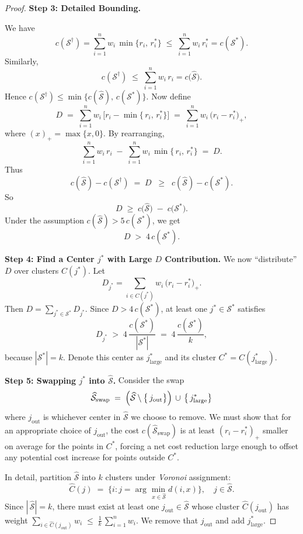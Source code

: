 \begin{proof}
\medskip
\noindent
\textbf{Step 3: Detailed Bounding.}

We have
\[
  c(\mathcal{S}^\dagger)
  =
  \sum_{i=1}^n
    w_i\,\min\{r_i,\,r_i^*\}
  \;\le\;
  \sum_{i=1}^n
    w_i\,r_i^*
  =
  c(\mathcal{S}^*).
\]
Similarly, 
\[
  c(\mathcal{S}^\dagger)
  \;\le\;
  \sum_{i=1}^n
    w_i\,r_i
  =
  c\!\bigl(\widehat{\mathcal{S}}\bigr).
\]
Hence $c(\mathcal{S}^\dagger)\le\min\bigl\{c(\widehat{\mathcal{S}}),\,c(\mathcal{S}^*)\bigr\}$.  
Now define
\[
   D
   \;=\;
   \sum_{i=1}^n
     w_i
     \,\bigl[
       r_i
       -
       \min\{\,r_i,\,r_i^*\}
     \bigr]
   \;=\;
   \sum_{i=1}^n
     w_i\,\bigl(r_i - r_i^*\bigr)_{+},
\]
where $(x)_{+}=\max\{x,0\}$.  By rearranging,
\[
  \sum_{i=1}^n w_i\,r_i
  \;-\;
  \sum_{i=1}^n w_i\,\min\{\,r_i,\,r_i^*\}
  \;=\;
  D.
\]
Thus
\[
  c(\widehat{\mathcal{S}}) - c(\mathcal{S}^\dagger)
  \;=\;
  D
  \;\;\ge\;\;
  c(\widehat{\mathcal{S}}) - c(\mathcal{S}^*).
\]
So
\[
  D
  \;\ge\;
  c\!\bigl(\widehat{\mathcal{S}}\bigr)
  \;-\;
  c\!\bigl(\mathcal{S}^*\bigr).
\]
Under the assumption $c(\widehat{\mathcal{S}})>5\,c(\mathcal{S}^*)$, we get 
\[
  D
  \;>\;
  4\,c(\mathcal{S}^*).
  \tag{*}
\]

\medskip
\noindent
\textbf{Step 4: Find a Center $j^*$ with Large $D$ Contribution.}
We now “distribute” $D$ over clusters $C(j^*)$.  Let
\[
  D_{j^*}
  =
  \sum_{i \in C(j^*)}
    w_i\,\bigl(r_i - r_i^*\bigr)_{+}.
\]
Then 
\(\displaystyle
D=\sum_{j^*\in \mathcal{S}^*} D_{j^*}.
\)
Since $D>4\,c(\mathcal{S}^*)$, at least one $j^*\in \mathcal{S}^*$ satisfies
\[
  D_{j^*}
  \;>\;
  4\,
  \frac{c(\mathcal{S}^*)}{|\mathcal{S}^*|}
  \;=\;
  4\,\frac{c(\mathcal{S}^*)}{k},
\]
because $|\mathcal{S}^*|=k$.  Denote this center as $j^*_{\text{large}}$ and its cluster $C^* = C(j^*_{\text{large}})$.

\medskip
\noindent
\textbf{Step 5: Swapping $j^*$ into $\widehat{\mathcal{S}}$.}
Consider the swap
\[
  \widehat{\mathcal{S}}_{\mathrm{swap}}
  \;=\;
  \Bigl(
    \widehat{\mathcal{S}}\setminus\bigl\{\,j_{\mathrm{out}}\bigr\}
  \Bigr)
  \,\cup\,
  \bigl\{\,j^*_{\text{large}}\bigr\}
\]
where $j_{\mathrm{out}}$ is whichever center in $\widehat{\mathcal{S}}$ we choose to remove.  We must show that for an appropriate choice of $j_{\mathrm{out}}$, the cost $c(\widehat{\mathcal{S}}_{\mathrm{swap}})$ is at least $(r_i - r_i^*)_{+}$ smaller on average for the points in $C^*$, forcing a net cost reduction large enough to offset any potential cost increase for points outside $C^*$.

In detail, partition $\widehat{\mathcal{S}}$ into $k$ clusters under \emph{Voronoi} assignment:
\[
  \widehat{C}(j)
  \;=\;
  \bigl\{
    i : 
    j=\arg\min_{\,x\in\widehat{\mathcal{S}}} d(i,x)
  \bigr\},
  \quad
  j\in \widehat{\mathcal{S}}.
\]
Since $|\,\widehat{\mathcal{S}}|=k$, there must exist at least one $j_{\mathrm{out}}\in \widehat{\mathcal{S}}$ whose cluster $\widehat{C}(j_{\mathrm{out}})$ has weight
\(\displaystyle
\sum_{i\in\widehat{C}(j_{\mathrm{out}})} w_i
 \;\le\;
 \frac{1}{k}\,\sum_{i=1}^n w_i.
\)
We remove that $j_{\mathrm{out}}$ and add $j^*_{\text{large}}$.


\end{proof}
